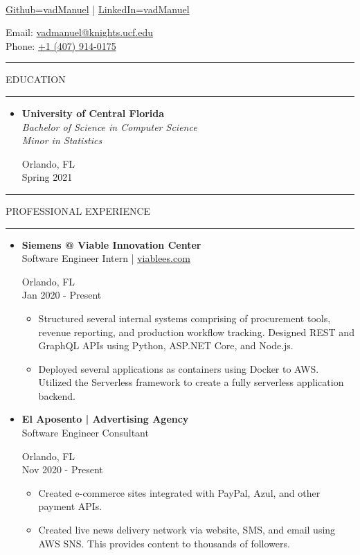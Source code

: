 \documentclass{article}
\makeatletter
\newcommand{\name}{Manuel Vasquez}
\newcommand{\website}{\href{https://www.github.com/vadmanuel}{Github=vadManuel} | \href{https://www.linkedin.com/in/vadmanuel}{LinkedIn=vadManuel}}
\newcommand{\email}{\href{mailto:vadmanuel@knights.ucf.edu}{vadmanuel@knights.ucf.edu}}
\newcommand{\phone}{\href{tel:+14079140175}{+1 (407) 914-0175}}
\newcommand{\makeminipage}[4]{
    \begin{minipage}[c]{.7\linewidth} 
        \flushleft #1 \\ #2
    \end{minipage} \hfill
    \begin{minipage}[c]{.29\linewidth}
        \flushright #3 \\ #4
    \end{minipage}
}
\newcommand{\makesection}[1]{\hrule\vskip1mm\uppercase{#1}\vskip1mm\hrule}
\makeatother
\begin{document}
\setlength{\parindent}{0cm}

\makeminipage
    {{\large\textbf{\name}}}
    {\website}
    {Email: \email}
    {Phone: \phone}
\bigbreak

\makesection{Education}
\begin{itemize}[leftmargin=.35cm]
    \item {
    \makeminipage
        {\textbf{University of Central Florida}}
        {\textit{Bachelor of Science in Computer Science} \\
        \textit{Minor in Statistics}}
        {Orlando, FL}
        {Spring 2021}
    }
\end{itemize}

\begin{minipage}[t]{.69\linewidth}
    \makesection{Professional Experience}
    \begin{itemize}[leftmargin=.35cm]

        \item \makeminipage
            {\textbf{Siemens @ Viable Innovation Center}}
            {Software Engineer Intern | \href{https://wwww.viablees.com}{viablees.com}}
            {Orlando, FL}
            {Jan 2020 - Present}
            \vspace*{-1.5mm}
            \begin{itemize}[leftmargin=.35cm]
                \item Structured several internal systems comprising of procurement tools, revenue reporting, and production workflow tracking. Designed REST and GraphQL APIs using Python, ASP.NET Core, and Node.js.
                \item Deployed several applications as containers using Docker to AWS. Utilized the Serverless framework to create a fully serverless application backend.
            \end{itemize}

        \item \makeminipage
            {\textbf{El Aposento | Advertising Agency}}
            {Software Engineer Consultant}
            {Orlando, FL}
            {Nov 2020 - Present}
            \vspace*{-1.5mm}
            \begin{itemize}[leftmargin=.35cm]
                \item Created e-commerce sites integrated with PayPal, Azul, and other payment APIs.
                \item Created live news delivery network via website, SMS, and email using AWS SNS. This provides content to thousands of followers.
            \end{itemize}


\end{itemize}
\end{minipage}
\end{document}

